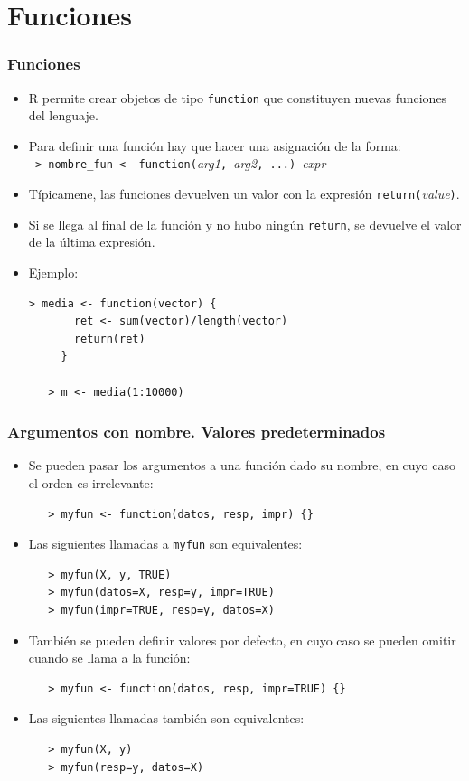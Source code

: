 \documentclass{beamer}
\begin{document}
\section{Funciones}

\begin{frame}[fragile]
\frametitle{Funciones}
\begin{itemize}
\item R permite crear objetos de tipo \texttt{function} que constituyen nuevas funciones del lenguaje.
\item Para definir una función hay que hacer una asignación de la forma:\\
\texttt{   > nombre\_fun <- function(}\textit{arg1}\texttt{, }\textit{arg2}\texttt{, ...) }\textit{expr}
\item Típicamene, las funciones devuelven un valor con la expresión \texttt{return(}\textit{value}\texttt{)}.
\item Si se llega al final de la función y no hubo ningún \texttt{return}, se devuelve el valor de la última expresión.
\item Ejemplo:
\begin{Verbatim}[fontsize=\small]
   > media <- function(vector) {
       ret <- sum(vector)/length(vector)
       return(ret)
     }

   > m <- media(1:10000)
\end{Verbatim}
\end{itemize}
\end{frame}

\begin{frame}[fragile]
\frametitle{Argumentos con nombre. Valores predeterminados}
\begin{itemize}
\item Se pueden pasar los argumentos a una función dado su nombre, en cuyo caso el orden es irrelevante:
\begin{verbatim}
   > myfun <- function(datos, resp, impr) {}
\end{verbatim}
\item Las siguientes llamadas a \texttt{myfun} son equivalentes:
\begin{verbatim}
   > myfun(X, y, TRUE)
   > myfun(datos=X, resp=y, impr=TRUE)
   > myfun(impr=TRUE, resp=y, datos=X)
\end{verbatim}
\item También se pueden definir valores por defecto, en cuyo caso se pueden omitir cuando se llama a la función:
\begin{verbatim}
   > myfun <- function(datos, resp, impr=TRUE) {}
\end{verbatim}
\item Las siguientes llamadas también son equivalentes:
\begin{verbatim}
   > myfun(X, y)
   > myfun(resp=y, datos=X)
\end{verbatim}
\end{itemize}
\end{frame}
\end{document}
